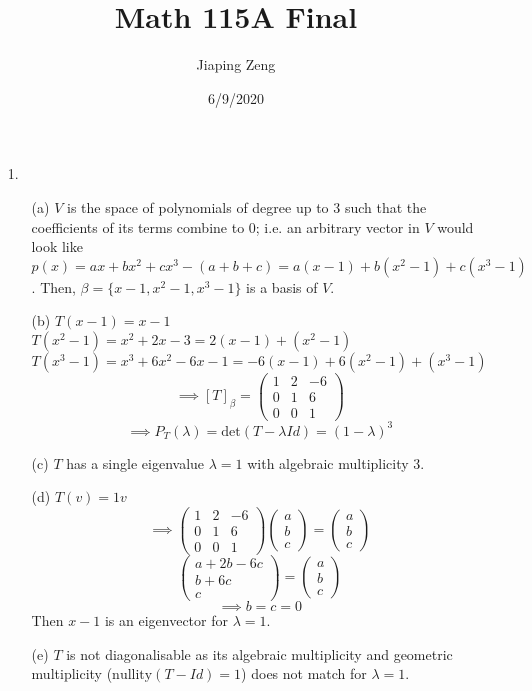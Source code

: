 \documentclass{article}
\title{Math 115A Final}
\author{Jiaping Zeng}
\date{6/9/2020}
\begin{document}

\begin{itemize}
	\item [1.]
	      \begin{itemize}
		      \item [(a)] $V$ is the space of polynomials of degree up to 3 such that the coefficients of its terms combine to 0; i.e. an arbitrary vector in $V$ would look like $p(x)=ax+bx^2+cx^3-(a+b+c)=a(x-1)+b(x^2-1)+c(x^3-1)$. Then, $\beta=\{x-1,x^2-1,x^3-1\}$ is a basis of $V$.
		      \item [(b)] $T(x-1)=x-1$\\$T(x^2-1)=x^2+2x-3=2(x-1)+(x^2-1)$\\$T(x^3-1)=x^3+6x^2-6x-1=-6(x-1)+6(x^2-1)+(x^3-1)$\[\implies[T]_\beta=\begin{pmatrix}
				            1 & 2 & -6 \\0&1&6\\0&0&1
			            \end{pmatrix}\]\[\implies P_T(\lambda)=\text{det}(T-\lambda Id)=(1-\lambda)^3\]
		      \item [(c)] $T$ has a single eigenvalue $\lambda=1$ with algebraic multiplicity $3$.
		      \item [(d)] $T(v)=1v$\[\implies\begin{pmatrix}1&2&-6\\0&1&6\\0&0&1\end{pmatrix}\begin{pmatrix}a\\b\\c\end{pmatrix}=\begin{pmatrix}a\\b\\c\end{pmatrix}\]\[\begin{pmatrix}
				            a+2b-6c \\b+6c\\c
			            \end{pmatrix}=\begin{pmatrix}
				            a \\b\\c
			            \end{pmatrix}\]\[\implies b=c=0\]Then $x-1$ is an eigenvector for $\lambda=1$.
		      \item [(e)] $T$ is not diagonalisable as its algebraic multiplicity and geometric multiplicity ($\text{nullity}(T-Id)=1$) does not match for $\lambda=1$.
	      \end{itemize}
\end{itemize}
\end{document}
